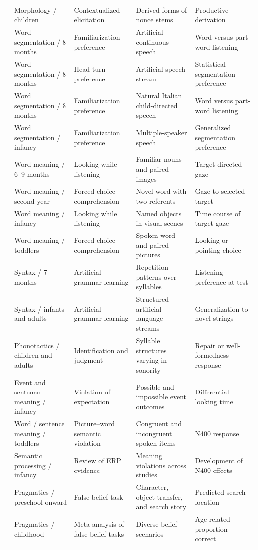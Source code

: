 \begin{longtable}{@{}p{}p{}p{}p{}p{}@{}}
\citet{Michaly2024} & Morphology / children & Contextualized elicitation & Derived forms of nonce stems & Productive derivation \\
\citet{Saffran1996} & Word segmentation / 8 months & Familiarization preference & Artificial continuous speech & Word versus part-word listening \\
\citet{Aslin1998} & Word segmentation / 8 months & Head-turn preference & Artificial speech stream & Statistical segmentation preference \\
\citet{Pelucchi2009} & Word segmentation / 8 months & Familiarization preference & Natural Italian child-directed speech & Word versus part-word listening \\
\citet{GrafEstes2012} & Word segmentation / infancy & Familiarization preference & Multiple-speaker speech & Generalized segmentation preference \\
\citet{BergelsonSwingley2012} & Word meaning / 6--9 months & Looking while listening & Familiar nouns and paired images & Target-directed gaze \\
\citet{Lany2011} & Word meaning / second year & Forced-choice comprehension & Novel word with two referents & Gaze to selected target \\
\citet{Bergelson2017} & Word meaning / infancy & Looking while listening & Named objects in visual scenes & Time course of target gaze \\
\citet{barbir2023rapid} & Word meaning / toddlers & Forced-choice comprehension & Spoken word and paired pictures & Looking or pointing choice \\
\citet{Marcus1999} & Syntax / 7 months & Artificial grammar learning & Repetition patterns over syllables & Listening preference at test \\
\citet{saffran2002statistical} & Syntax / infants and adults & Artificial grammar learning & Structured artificial-language streams & Generalization to novel strings \\
\citet{berent2012binding} & Phonotactics / children and adults & Identification and judgment & Syllable structures varying in sonority & Repair or well-formedness response \\
\citet{Margoni2023} & Event and sentence meaning / infancy & Violation of expectation & Possible and impossible event outcomes & Differential looking time \\
\citet{friedrich2006early} & Word / sentence meaning / toddlers & Picture--word semantic violation & Congruent and incongruent spoken items & N400 response \\
\citet{lozano2025development} & Semantic processing / infancy & Review of ERP evidence & Meaning violations across studies & Development of N400 effects \\
\citet{WimmerPerner1983} & Pragmatics / preschool onward & False-belief task & Character, object transfer, and search story & Predicted search location \\
\citet{Wellman2001} & Pragmatics / childhood & Meta-analysis of false-belief tasks & Diverse belief scenarios & Age-related proportion correct \\
\end{longtable}
